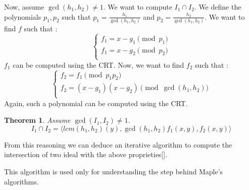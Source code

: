 \documentclass{article}
\newtheorem{theorem}{Theorem}[section]
\begin{document}
Now, assume $\gcd(h_{1}, {h_2}) \neq 1$. 
We want to compute $I_{1} \cap I_{2}$. We define the polynomials $p_{1}, p_{2}$ such that $p_{1} = \displaystyle \frac{h_{1}}{\gcd(h_{1}, h_{2})}$ and $p_{2} = \displaystyle \frac{h_{2}}{\gcd(h_{1}, h_{2})}$. We want to find $f$ such that : 
\begin{displaymath}
    \left\{
    \begin{array}{ll}
        f_{1} = x-g_{1} \pmod {p_{1}} \\
        f_{1} = x-g_{2} \pmod {p_{2}} \\
    \end{array}
    \right.
\end{displaymath}
$f_{1}$ can be computed using the CRT. Now, we want to find $f_{2}$ such that : 
\begin{displaymath}
    \left\{
    \begin{array}{ll}
        f_{2} = f_{1} \pmod {p_{1}p_{2}} \\
        f_{2} = (x-g_{1})(x-g_{2}) \pmod {\gcd(h_{1}, h_{2})} \\
    \end{array}
    \right.
\end{displaymath}
Again, such a polynomial can be computed using the CRT. 

\begin{theorem}
    Assume $\gcd(I_{1}, I_{2}) \neq 1$. 
    \begin{displaymath}
        I_{1} \cap I_{2} = \langle lcm(h_{1}, h_{2})(y), \gcd(h_{1},h_{2})f_{1}(x,y), f_{2}(x,y) \rangle
    \end{displaymath}
\end{theorem}

From this reasoning we can deduce an iterative algorithm to compute the intersection of two ideal with the above proprieties[].


This algorithm is used only for understanding the step behind Maple's algorithms.
\end{document}
